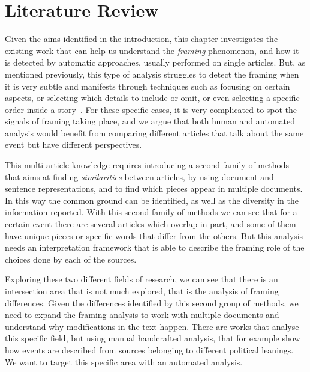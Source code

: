 \chapter{Literature Review}
\label{chap:literature_review}



Given the aims identified in the introduction, this chapter investigates the existing work that can help us understand the \emph{framing} phenomenon, and how it is detected by automatic approaches, usually performed on single articles.
But, as mentioned previously, this type of analysis struggles to detect the framing when it is very subtle and manifests through techniques such as focusing on certain aspects, or selecting which details to include or omit, or even selecting a specific order inside a story~\cite{morstatter2018identifying}.
For these specific cases, it is very complicated to spot the signals of framing taking place, and we argue that both human and automated analysis would benefit from comparing different articles that talk about the same event but have different perspectives. %

This multi-article knowledge requires introducing a second family of methods that aims at finding \emph{similarities} between articles, by using document and sentence representations, and to find which pieces appear in multiple documents. In this way the common ground can be identified, as well as the diversity in the information reported.
With this second family of methods we can see that for a certain event there are several articles which overlap in part, and some of them have unique pieces or specific words that differ from the others. But this analysis needs an interpretation framework that is able to describe the framing role of the choices done by each of the sources.

Exploring these two different fields of research, we can see that there is an intersection area that is not much explored, that is the analysis of framing differences. Given the differences identified by this second group of methods, we need to expand the framing analysis to work with multiple documents and understand why modifications in the text happen.
There are works that analyse this specific field, but using manual handcrafted analysis, that for example show how events are described from sources belonging to different political leanings. We want to target this specific area with an automated analysis.

